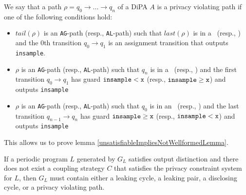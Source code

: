 \begin{defn}
    We say that a path $\rho = q_0\to\ldots \to q_n $ of a DiPA $A$ is a privacy violating path if one of the following conditions hold:
    \begin{itemize}
        \item  $tail(\rho)$ is an \texttt{AG}-path (resp., \texttt{AL}-path) such that $last(\rho)$ is in a \gcycle~(resp., \lcycle) and the 0th transition $q_0\to q_1$ is an assignment transition that outputs \texttt{insample}.
        \item $\rho$ is an \texttt{AG}-path (resp., \texttt{AL}-path) such that $q_n$ is in a \gcycle~(resp., \lcycle) and the first transition $q_0\to q_1$ has guard $\lguard[\texttt{x}]$ (resp., $\gguard[\texttt{x}]$) and outputs \texttt{insample}
        \item $\rho$ is an \texttt{AG}-path (resp., \texttt{AL}-path) such that $q_0$ is in an \lcycle~(resp., \gcycle) and the last transition $q_{n-1}\to q_n$ has guard $\gguard[\texttt{x}]$ (resp., $\lguard[\texttt{x}]$) and outputs \texttt{insample}
    \end{itemize}
\end{defn}

This allows us to prove lemma \ref{unsatisfiableImpliesNotWellformedLemma}.

\begin{lemma}\label{unsatisfiableImpliesNotWellformedLemma}
    If a periodic program $L$ generated by $G_L$ satisfies output distinction and there does not exist a coupling strategy $C$ that satisfies the privacy constraint system for $L$, then $G_L$ must contain either a leaking cycle, a leaking pair, a disclosing cycle, or a privacy violating path. 
\end{lemma}

